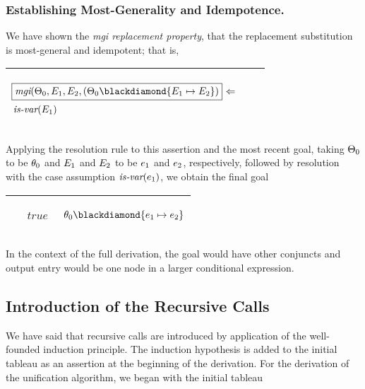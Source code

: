 \documentclass[runningheads]{llncs}
\DeclareMathOperator{\uimpliedby}{\Leftarrow}
\DeclareMathOperator{\isvar}{\emph{is-var}}
\DeclareMathOperator{\mgi}{\emph{mgi}}
\begin{document}
\subsubsection{Establishing Most-Generality and Idempotence.} We have shown the \emph{mgi replacement property}, that the replacement substitution is  most-general and idempotent; that is,

\begin{center}
  \begin{tabular}{|m{}|m{}||m{}|}
\hline
\begin{center}$
\begin{aligned}
    &\boxed{\mgi(\Thet{0}, \E{1}, \E{2}, (\Thet{0} \compose \{\E{1} \mapsto \E{2}\})} \, \uimpliedby \\
    &\isvar(\E{1})
\end{aligned}
$\end{center}
& &  \\  \hline
\end{tabular}
\end{center}
Applying the resolution rule to this assertion and the most recent goal, 
taking $\Theta_{0}$ to be $\theta_{0}$ and $E_{1}$ and $E_{2}$ to be $e_{1}$ and $e_{2}$, respectively, followed by resolution with the case assumption $\isvar(\e{1})$, we obtain the final goal
\begin{center}
\begin{tabular}{|m{}|m{}||m{}|}
 \hline 
  &\begin{center} 
$\begin{aligned}
  true
  \end{aligned}$
\end{center}
& 
\begin{center}$\thet{0} \compose \{\e{1} \mapsto  \e{2}\}$ \end{center}\\
\hline
\end{tabular}
\end{center}
In the context of the full derivation, the goal would have other conjuncts and  output entry would be one node in a larger conditional expression.   

\subsection{Introduction of the Recursive Calls}

We have said that recursive calls are introduced by application of the well-founded induction principle. The induction hypothesis is added to the initial tableau as an assertion at the beginning of the derivation.  For the derivation of the unification algorithm, we began with the initial tableau
\end{document}
